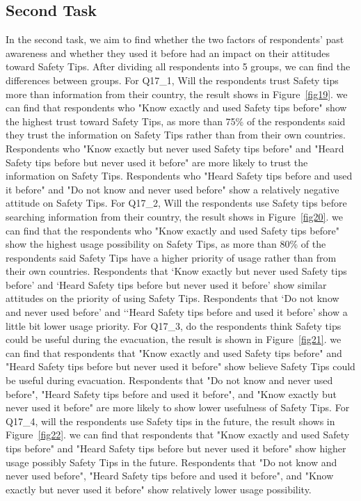 \subsection{Second Task}
In the second task, we aim to find whether the two factors of respondents' past awareness and whether they used it before had an impact on their attitudes toward Safety Tips. After dividing all respondents into 5 groups, we can find the differences between groups. For Q17\_1, Will the respondents trust Safety tips more than information from their country, the result shows in Figure~\ref{fig19}. we can find that respondents who "Know exactly and used Safety tips before" show the highest trust toward Safety Tips, as more than 75\% of the respondents said they trust the information on Safety Tips rather than from their own countries. Respondents who "Know exactly but never used Safety tips before" and "Heard Safety tips before but never used it before" are more likely to trust the information on Safety Tips. Respondents who "Heard Safety tips before and used it before" and "Do not know and never used before" show a relatively negative attitude on Safety Tips. For Q17\_2, Will the respondents use Safety tips before searching information from their country, the result shows in Figure~\ref{fig20}. we can find that the respondents who "Know exactly and used Safety tips before" show the highest usage possibility on Safety Tips, as more than 80\% of the respondents said Safety Tips have a higher priority of usage rather than from their own countries. Respondents that ‘Know exactly but never used Safety tips before' and ‘Heard Safety tips before but never used it before' show similar attitudes on the priority of using Safety Tips. Respondents that ‘Do not know and never used before' and ‘‘Heard Safety tips before and used it before' show a little bit lower usage priority. For Q17\_3, do the respondents think Safety tips could be useful during the evacuation, the result is shown in Figure~\ref{fig21}. we can find that respondents that "Know exactly and used Safety tips before" and "Heard Safety tips before but never used it before" show believe Safety Tips could be useful during evacuation. Respondents that "Do not know and never used before", "Heard Safety tips before and used it before", and "Know exactly but never used it before" are more likely to show lower usefulness of Safety Tips. For Q17\_4, will the respondents use Safety tips in the future, the result shows in Figure~\ref{fig22}. we can find that respondents that "Know exactly and used Safety tips before" and "Heard Safety tips before but never used it before" show higher usage possibly Safety Tips in the future. Respondents that "Do not know and never used before", "Heard Safety tips before and used it before", and "Know exactly but never used it before" show relatively lower usage possibility.

